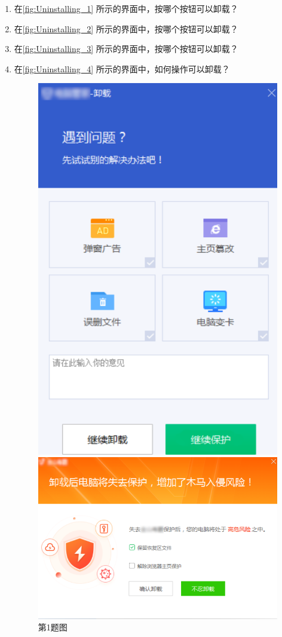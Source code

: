 \begin{enumerate}
  \item 在\autoref{fig:Uninstalling_1} 所示的界面中，按哪个按钮可以卸载？
  \item 在\autoref{fig:Uninstalling_2} 所示的界面中，按哪个按钮可以卸载？
  \item 在\autoref{fig:Uninstalling_3} 所示的界面中，按哪个按钮可以卸载？
  \item 在\autoref{fig:Uninstalling_4} 所示的界面中，如何操作可以卸载？
    \begin{figure}[htb!]
      \centering
      \begin{minipage}{.44\textwidth}
        \centering
        \includegraphics[width=.8\textwidth]{assets/basic/Uninstalling_1.png}
        \caption{第1题图}
        \label{fig:Uninstalling_1}
      \end{minipage}
      \begin{minipage}{.55\textwidth}
        \centering
        \includegraphics[width=.75\textwidth]{assets/basic/Uninstalling_2.png}

\end{minipage}
\end{figure}
\end{enumerate}
